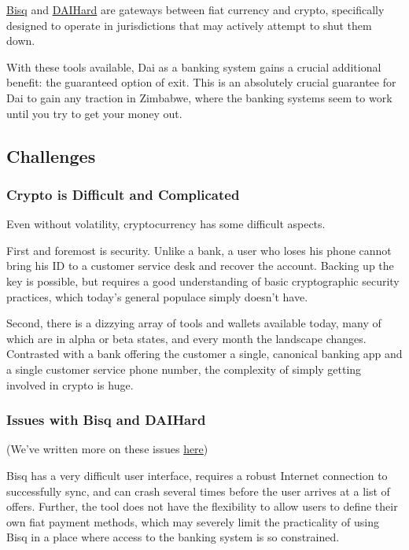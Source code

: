 \documentclass{article}
\begin{document}
\href{https://bisq.network/}{Bisq} and \href{daihard.io}{DAIHard} are gateways between fiat currency and crypto, specifically designed to operate in jurisdictions that may actively attempt to shut them down.

With these tools available, Dai as a banking system gains a crucial additional benefit: the guaranteed option of exit. This is an absolutely crucial guarantee for Dai to gain any traction in Zimbabwe, where the banking systems seem to work until you try to get your money out.

\subsection{Challenges} \label{challenges}

\subsubsection{Crypto is Difficult and Complicated} \label{difficult}

Even without volatility, cryptocurrency has some difficult aspects.

First and foremost is security. Unlike a bank, a user who loses his phone cannot bring his ID to a customer service desk and recover the account. Backing up the key is possible, but requires a good understanding of basic cryptographic security practices, which today's general populace simply doesn't have.

Second, there is a dizzying array of tools and wallets available today, many of which are in alpha or beta states, and every month the landscape changes. Contrasted with a bank offering the customer a single, canonical banking app and a single customer service phone number, the complexity of simply getting involved in crypto is huge.

\subsubsection{Issues with Bisq and DAIHard} \label{exchange issues}

(We've written more on these issues \href{https://bisq.network/}{here})

Bisq has a very difficult user interface, requires a robust Internet connection to successfully sync, and can crash several times before the user arrives at a list of offers. Further, the tool does not have the flexibility to allow users to define their own fiat payment methods, which may severely limit the practicality of using Bisq in a place where access to the banking system is so constrained.
\end{document}
